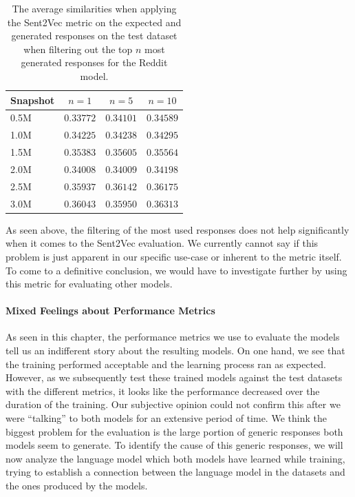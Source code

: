 \begin{table}[H]
	\centering
	\begin{adjustbox}{max width=\textwidth}
		\begin{tabular}{lccc}
			\toprule
			Snapshot & $n = 1$ & $n = 5$ & $n = 10$\\
			\midrule
			0.5M & $0.33772$ & $0.34101$ & $0.34589$\\
			1.0M & $0.34225$ & $0.34238$ & $0.34295$\\
			1.5M & $0.35383$ & $0.35605$ & $0.35564$\\
			2.0M & $0.34008$ & $0.34009$ & $0.34198$\\
			2.5M & $0.35937$ & $0.36142$ & $0.36175$\\
			3.0M & $0.36043$ & $0.35950$ & $0.36313$\\
			\bottomrule
		\end{tabular}
	\end{adjustbox}
	\caption{The average similarities when applying the Sent2Vec metric on the expected and generated responses on the test dataset when filtering out the top $n$ most generated responses for the Reddit model.}
	\label{results:sent2vec:reddit:top_n_results_table}
\end{table}

As seen above, the filtering of the most used responses does not help significantly when it comes to the Sent2Vec evaluation. We currently cannot say if this problem is just apparent in our specific use-case or inherent to the metric itself. To come to a definitive conclusion, we would have to investigate further by using this metric for evaluating other models.

\paragraph{Mixed Feelings about Performance Metrics} As seen in this chapter, the performance metrics we use to evaluate the models tell us an indifferent story about the resulting models. On one hand, we see that the training performed acceptable and the learning process ran as expected. However, as we subsequently test these trained models against the test datasets with the different metrics, it looks like the performance decreased over the duration of the training. Our subjective opinion could not confirm this after we were ``talking'' to both models for an extensive period of time. We think the biggest problem for the evaluation is the large portion of generic responses both models seem to generate. To identify the cause of this generic responses, we will now analyze the language model which both models have learned while training, trying to establish a connection between the language model in the datasets and the ones produced by the models.


